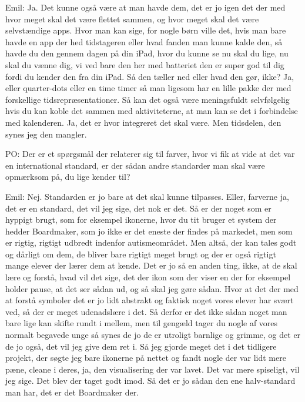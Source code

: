 Emil:
Ja.
Det kunne også være at man havde dem, det er jo igen det der med hvor meget skal det være flettet sammen, og hvor meget skal det være selvstændige apps. 
Hvor man kan sige, for nogle børn ville det, hvis man bare havde en app der hed tidstageren eller hvad fanden man kunne kalde den, så havde du den gennem dagen på din iPad, hvor du kunne se nu skal du lige, nu skal du vænne dig, vi ved bare den her med batteriet den er super god til dig fordi du kender den fra din iPad.
Så den tæller ned eller hvad den gør, ikke?
Ja, eller quarter-dots eller en time timer så man ligesom har en lille pakke der med forskellige tidsrepræsentationer.  
Så kan det også være meningsfuldt selvfølgelig hvis du kan koble det sammen med aktiviteterne, at man kan se det i forbindelse med kalenderen. 
Ja, det er hvor integreret det skal være.   
Men tidsdelen, den synes jeg den mangler.

PO:
Der er et spørgsmål der relaterer sig til farver, hvor vi fik at vide at det var en international standard, er der sådan andre standarder man skal være opmærksom på, du lige kender til?

Emil: 
Nej.
Standarden er jo bare at det skal kunne tilpasses. 
Eller, farverne ja, det er en standard, det vil jeg sige, det nok er det. 
Så er der noget som er hyppigt brugt, som for eksempel ikonerne, hvor du tit bruger et system der hedder Boardmaker, som jo ikke er det eneste der findes på markedet, men som er rigtig, rigtigt udbredt indenfor autismeområdet.
Men altså, der kan tales godt og dårligt om dem, de bliver bare rigtigt meget brugt og der er også rigtigt mange elever der lærer dem at kende.
Det er jo så en anden ting, ikke, at de skal lære og forstå, hvad vil det sige, det der ikon som der viser en der for eksempel holder pause, at det ser sådan ud, og så skal jeg gøre sådan.
Hvor at det der med at forstå symboler det er jo lidt abstrakt og faktisk noget vores elever har svært ved, så der er meget udenadslære i det.
Så derfor er det ikke sådan noget man bare lige kan skifte rundt i mellem, men til gengæld tager du nogle af vores normalt begavede unge så synes de jo de er utroligt barnlige og grimme, og det er de jo også, det vil jeg give dem ret i.
Så jeg gjorde meget det i det tidligere projekt, der søgte jeg bare ikonerne på nettet og fandt nogle der var lidt mere pæne, cleane i deres, ja, den visualisering der var lavet. 
Det var mere spiseligt, vil jeg sige.
Det blev der taget godt imod. 
Så det er jo sådan den ene halv-standard man har, det er det Boardmaker der. 

